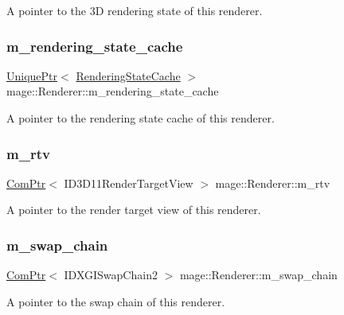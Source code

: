 A pointer to the 3D rendering state of this renderer. \hypertarget{classmage_1_1_renderer_a3d9f823ecef314a974c4cdb3a71a1853}{}\label{classmage_1_1_renderer_a3d9f823ecef314a974c4cdb3a71a1853} 
\subsubsection{\texorpdfstring{m\+\_\+rendering\+\_\+state\+\_\+cache}{m\_rendering\_state\_cache}}
{\footnotesize\ttfamily \hyperlink{namespacemage_a8c307fbcc33bce9b7f2aa4c26c3b95cf}{Unique\+Ptr}$<$ \hyperlink{structmage_1_1_rendering_state_cache}{Rendering\+State\+Cache} $>$ mage\+::\+Renderer\+::m\+\_\+rendering\+\_\+state\+\_\+cache\hspace{0.3cm}{\ttfamily [private]}}

A pointer to the rendering state cache of this renderer. \hypertarget{classmage_1_1_renderer_a86ed436120830cef3e0173f85550aa50}{}\label{classmage_1_1_renderer_a86ed436120830cef3e0173f85550aa50} 
\subsubsection{\texorpdfstring{m\+\_\+rtv}{m\_rtv}}
{\footnotesize\ttfamily \hyperlink{namespacemage_ae74f374780900893caa5555d1031fd79}{Com\+Ptr}$<$ I\+D3\+D11\+Render\+Target\+View $>$ mage\+::\+Renderer\+::m\+\_\+rtv\hspace{0.3cm}{\ttfamily [private]}}

A pointer to the render target view of this renderer. \hypertarget{classmage_1_1_renderer_a5419a7a11e8f0f69e92dd6a5cb9bd217}{}\label{classmage_1_1_renderer_a5419a7a11e8f0f69e92dd6a5cb9bd217} 
\subsubsection{\texorpdfstring{m\+\_\+swap\+\_\+chain}{m\_swap\_chain}}
{\footnotesize\ttfamily \hyperlink{namespacemage_ae74f374780900893caa5555d1031fd79}{Com\+Ptr}$<$ I\+D\+X\+G\+I\+Swap\+Chain2 $>$ mage\+::\+Renderer\+::m\+\_\+swap\+\_\+chain\hspace{0.3cm}{\ttfamily [private]}}

A pointer to the swap chain of this renderer. 